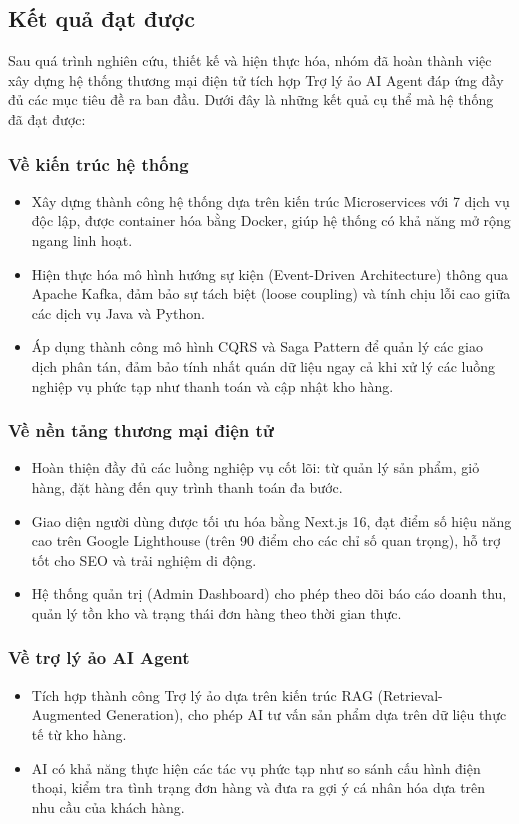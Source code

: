 \subsection{Kết quả đạt được}

Sau quá trình nghiên cứu, thiết kế và hiện thực hóa, nhóm đã hoàn thành việc xây dựng hệ thống thương mại điện tử tích hợp Trợ lý ảo AI Agent đáp ứng đầy đủ các mục tiêu đề ra ban đầu. Dưới đây là những kết quả cụ thể mà hệ thống đã đạt được:

\subsubsection{Về kiến trúc hệ thống}
\begin{itemize}
    \item Xây dựng thành công hệ thống dựa trên kiến trúc Microservices với 7 dịch vụ độc lập, được container hóa bằng Docker, giúp hệ thống có khả năng mở rộng ngang linh hoạt.
    \item Hiện thực hóa mô hình hướng sự kiện (Event-Driven Architecture) thông qua Apache Kafka, đảm bảo sự tách biệt (loose coupling) và tính chịu lỗi cao giữa các dịch vụ Java và Python.
    \item Áp dụng thành công mô hình CQRS và Saga Pattern để quản lý các giao dịch phân tán, đảm bảo tính nhất quán dữ liệu ngay cả khi xử lý các luồng nghiệp vụ phức tạp như thanh toán và cập nhật kho hàng.
\end{itemize}

\subsubsection{Về nền tảng thương mại điện tử}
\begin{itemize}
    \item Hoàn thiện đầy đủ các luồng nghiệp vụ cốt lõi: từ quản lý sản phẩm, giỏ hàng, đặt hàng đến quy trình thanh toán đa bước.
    \item Giao diện người dùng được tối ưu hóa bằng Next.js 16, đạt điểm số hiệu năng cao trên Google Lighthouse (trên 90 điểm cho các chỉ số quan trọng), hỗ trợ tốt cho SEO và trải nghiệm di động.
    \item Hệ thống quản trị (Admin Dashboard) cho phép theo dõi báo cáo doanh thu, quản lý tồn kho và trạng thái đơn hàng theo thời gian thực.
\end{itemize}

\subsubsection{Về trợ lý ảo AI Agent}
\begin{itemize}
    \item Tích hợp thành công Trợ lý ảo dựa trên kiến trúc RAG (Retrieval-Augmented Generation), cho phép AI tư vấn sản phẩm dựa trên dữ liệu thực tế từ kho hàng.
    \item AI có khả năng thực hiện các tác vụ phức tạp như so sánh cấu hình điện thoại, kiểm tra tình trạng đơn hàng và đưa ra gợi ý cá nhân hóa dựa trên nhu cầu của khách hàng.
\end{itemize}


